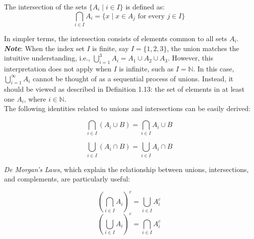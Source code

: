 \begin{definition}
    The intersection of the sets \(\{A_i \mid i \in I\}\) is defined as:
\[
\bigcap_{i \in I} A_i = \{x \mid x \in A_j \text{ for every } j \in I\}
\]
\end{definition}

In simpler terms, the intersection consists of elements common to all sets \(A_i\). \\

\textbf{\textit{Note}}: When the index set \(I\) is finite, say \(I = \{1, 2, 3\}\), the union matches the intuitive understanding, i.e., \(\bigcup_{i=1}^{3} A_i = A_1 \cup A_2 \cup A_3\). However, this interpretation does not apply when \(I\) is infinite, such as \(I = \mathbb{N}\). In this case, \(\bigcup_{i=1}^{\infty} A_i\) cannot be thought of as a sequential process of unions. Instead, it should be viewed as described in Definition 1.13: the set of elements in at least one \(A_i\), where \(i \in \mathbb{N}\). \\

The following identities related to unions and intersections can be easily derived:

\begin{equation}
\bigcap_{i \in I} (A_i \cup B) = \bigcap_{i \in I} A_i \cup B 
\end{equation}

\begin{equation}
\bigcup_{i \in I} (A_i \cap B) = \bigcup_{i \in I} A_i \cap B 
\end{equation}

\textit{De Morgan's Laws}, which explain the relationship between unions, intersections, and complements, are particularly useful:

\begin{theorem}
\begin{equation}
            \left(\bigcap_{i \in I} A_i\right)^c = \bigcup_{i \in I} A_i^c
        \end{equation}
\begin{equation}
            \left(\bigcup_{i \in I} A_i\right)^c = \bigcap_{i \in I} A_i^c
        \end{equation}
\end{theorem}

